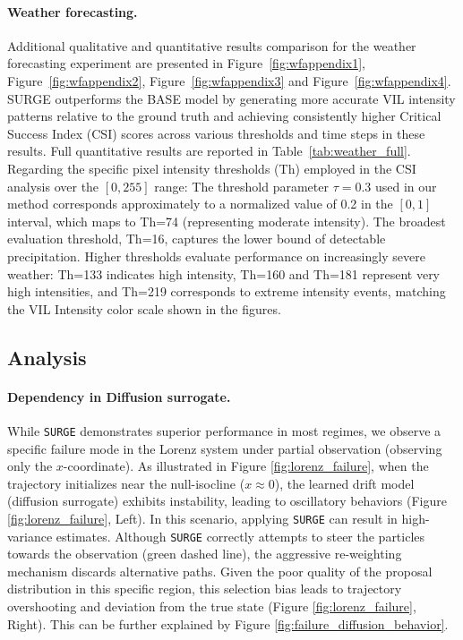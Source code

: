 \documentclass{article}
\theoremstyle{plain}
\theoremstyle{definition}
\theoremstyle{remark}
\begin{document}
\paragraph{Weather forecasting.} Additional qualitative and quantitative results comparison for the weather forecasting experiment are presented in Figure~\ref{fig:wfappendix1}, Figure~\ref{fig:wfappendix2}, Figure~\ref{fig:wfappendix3} and Figure~\ref{fig:wfappendix4}. SURGE outperforms the BASE model by generating more accurate VIL intensity patterns relative to the ground truth and achieving consistently higher Critical Success Index (CSI) scores across various thresholds and time steps in these results. Full quantitative results are reported in Table~\ref{tab:weather_full}. Regarding the specific pixel intensity thresholds (Th) employed in the CSI analysis over the $[0, 255]$ range: The threshold parameter $\tau=0.3$ used in our method corresponds approximately to a normalized value of 0.2 in the $[0, 1]$ interval, which maps to Th=74 (representing moderate intensity). The broadest evaluation threshold, Th=16, captures the lower bound of detectable precipitation. Higher thresholds evaluate performance on increasingly severe weather: Th=133 indicates high intensity, Th=160 and Th=181 represent very high intensities, and Th=219 corresponds to extreme intensity events, matching the VIL Intensity color scale shown in the figures.

\subsection{Analysis}
\paragraph{Dependency in Diffusion surrogate.} While \texttt{SURGE} demonstrates superior performance in most regimes, we observe a specific failure mode in the Lorenz system under partial observation (observing only the $x$-coordinate). As illustrated in Figure \ref{fig:lorenz_failure}, when the trajectory initializes near the null-isocline ($x \approx 0$), the learned drift model (diffusion surrogate) exhibits instability, leading to oscillatory behaviors (Figure \ref{fig:lorenz_failure}, Left). In this scenario, applying \texttt{SURGE} can result in high-variance estimates. Although \texttt{SURGE} correctly attempts to steer the particles towards the observation (green dashed line), the aggressive re-weighting mechanism discards alternative paths. Given the poor quality of the proposal distribution in this specific region, this selection bias leads to trajectory overshooting and deviation from the true state (Figure \ref{fig:lorenz_failure}, Right). This can be further explained by Figure \ref{fig:failure_diffusion_behavior}.
\end{document}
